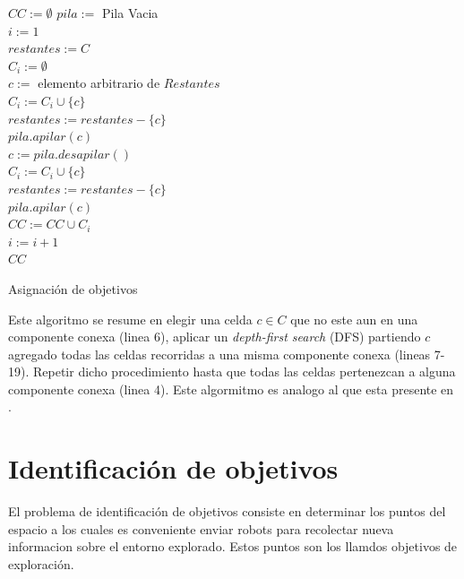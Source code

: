\begin{algorithm}[H]
\SetAlgoLined
  $CC := \emptyset$
  $pila :=$ Pila Vacia \\
  $i := 1$ \\
  $restantes := C$ \\
   {
    $C_i := \emptyset $ \\
    $c :=$ elemento arbitrario de $Restantes$ \\


    $C_i :=  C_i \cup \{c\}$ \\
    $restantes := restantes - \{c\}$ \\
    $pila.apilar(c)$ \\
     {
      $c := pila.desapilar()$ \\
       {
         {
          $C_i :=  C_i \cup \{c\}$ \\
          $restantes := restantes - \{c\}$ \\
          $pila.apilar(c)$ \\
        }
      }
    }
    $CC := CC \cup C_i$ \\
    $i := i + 1$ \\
  }
  \Return $CC$ 

  \caption{Asignación de objetivos}
  \label{alg:compcon}
\end{algorithm}

Este algoritmo se resume en elegir una celda $c\in C$ que no este aun en una
componente conexa (linea 6), aplicar un \emph{depth-first search} (DFS)
partiendo $c$ agregado todas las celdas recorridas a una misma componente
conexa (lineas 7-19). Repetir dicho procedimiento hasta que todas las celdas
pertenezcan a alguna componente conexa (linea 4). Este algormitmo es analogo al
que esta presente en \cite{hopcroft1973algorithm}.

\section{Identificación de objetivos}
El problema de identificación de objetivos consiste en determinar los puntos
del espacio a los cuales es conveniente enviar robots para recolectar nueva
informacion sobre el entorno explorado. Estos puntos son los llamdos objetivos
de exploración. 

